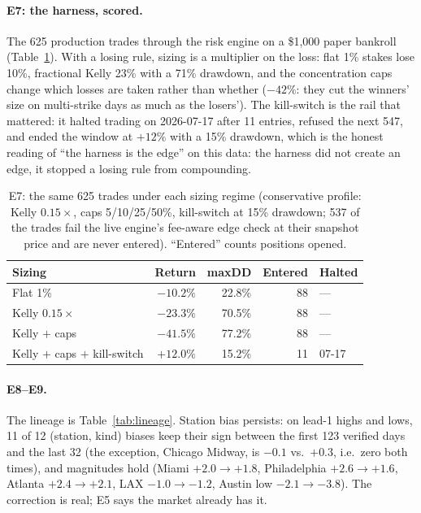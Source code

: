 \documentclass[sigconf,review,anonymous]{acmart}
\begin{document}
\paragraph{E7: the harness, scored.} The 625 production trades through the
risk engine on a \$1{,}000 paper bankroll (Table~\ref{tab:sim}). With a losing
rule, sizing is a multiplier on the loss: flat 1\% stakes lose 10\%, fractional
Kelly 23\% with a 71\% drawdown, and the concentration caps change which losses
are taken rather than whether ($-42\%$: they cut the winners' size on
multi-strike days as much as the losers'). The kill-switch is the rail that
mattered: it halted trading on 2026-07-17 after 11 entries, refused the next
547, and ended the window at $+12\%$ with a 15\% drawdown, which is the
honest reading of ``the harness is the edge'' on this data: the harness did not
create an edge, it stopped a losing rule from compounding.

\begin{table}[t]
\centering
\small
\begin{tabular}{@{}lrrrl@{}}
\toprule
\textbf{Sizing} & \textbf{Return} & \textbf{maxDD} & \textbf{Entered} & \textbf{Halted} \\
\midrule
Flat 1\% & $-10.2\%$ & 22.8\% & 88 & --- \\
Kelly $0.15\times$ & $-23.3\%$ & 70.5\% & 88 & --- \\
Kelly $+$ caps & $-41.5\%$ & 77.2\% & 88 & --- \\
Kelly $+$ caps $+$ kill-switch & $+12.0\%$ & 15.2\% & 11 & 07-17 \\
\bottomrule
\end{tabular}
\caption{E7: the same 625 trades under each sizing regime (conservative
profile: Kelly $0.15\times$, caps 5/10/25/50\%, kill-switch at 15\% drawdown;
537 of the trades fail the live engine's fee-aware edge check at their
snapshot price and are never entered). ``Entered'' counts positions opened.}
\label{tab:sim}
\end{table}

\paragraph{E8--E9.} The lineage is Table~\ref{tab:lineage}. Station bias
persists: on lead-1 highs and lows, 11 of 12 (station, kind) biases keep their
sign between the first 123 verified days and the last 32 (the exception,
Chicago Midway, is $-0.1$ vs.\ $+0.3$, i.e.\ zero both times), and magnitudes
hold (Miami $+2.0 \to +1.8$, Philadelphia $+2.6 \to +1.6$, Atlanta
$+2.4 \to +2.1$, LAX $-1.0 \to -1.2$, Austin low $-2.1 \to -3.8$). The
correction is real; E5 says the market already has it.
\end{document}

